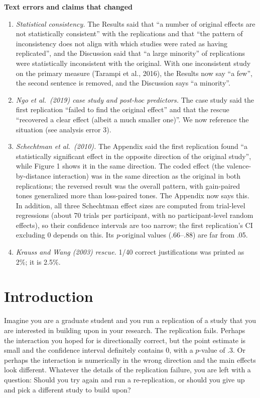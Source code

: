\documentclass[
  english,
  a4paper,
]{article}
\providecommand{\tightlist}{%
  \setlength{\itemsep}{0pt}\setlength{\parskip}{0pt}}
\begin{document}
\textbf{Text errors and claims that changed}

\begin{enumerate}
\def\labelenumi{\arabic{enumi}.}
\tightlist
\item
  \emph{Statistical consistency.} The Results said that ``a number of original effects are not statistically consistent'' with the replications and that ``the pattern of inconsistency does not align with which studies were rated as having replicated'', and the Discussion said that ``a large minority'' of replications were statistically inconsistent with the original. With one inconsistent study on the primary measure (Tarampi et al., 2016), the Results now say ``a few'', the second sentence is removed, and the Discussion says ``a minority''.
\item
  \emph{Ngo et al.~(2019) case study and post-hoc predictors.} The case study said the first replication ``failed to find the original effect'' and that the rescue ``recovered a clear effect (albeit a much smaller one)''. We now reference the situation (see analysis error 3).
\item
  \emph{Schechtman et al.~(2010).} The Appendix said the first replication found ``a statistically significant effect in the opposite direction of the original study'', while Figure 1 shows it in the same direction. The coded effect (the valence-by-distance interaction) was in the same direction as the original in both replications; the reversed result was the overall pattern, with gain-paired tones generalized more than loss-paired tones. The Appendix now says this. In addition, all three Schechtman effect sizes are computed from trial-level regressions (about 70 trials per participant, with no participant-level random effects), so their confidence intervals are too narrow; the first replication's CI excluding 0 depends on this. Its \emph{p}-original values (.66--.88) are far from .05.
\item
  \emph{Krauss and Wang (2003) rescue.} 1/40 correct justifications was printed as 2\%; it is 2.5\%.
\end{enumerate}

\endgroup

\newpage

\section{Introduction}\label{introduction}

Imagine you are a graduate student and you run a replication of a study that you are interested in building upon in your research.
The replication fails.
Perhaps the interaction you hoped for is directionally correct, but the point estimate is small and the confidence interval definitely contains 0, with a \(p\)-value of .3.
Or perhaps the interaction is numerically in the wrong direction and the main effects look different.
Whatever the details of the replication failure, you are left with a question: Should you try again and run a re-replication, or should you give up and pick a different study to build upon?
\end{document}
